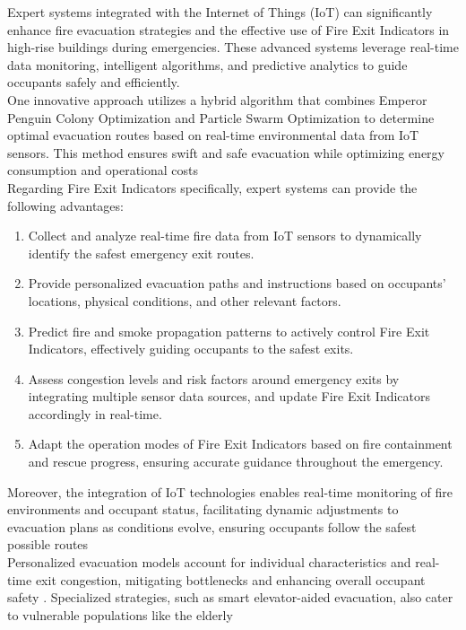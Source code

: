 \documentclass[12pt,a4paper]{article}
\begin{document}
\noindent Expert systems integrated with the Internet of Things (IoT) can significantly enhance fire evacuation strategies and the effective use of Fire Exit Indicators in high-rise buildings during emergencies. These advanced systems leverage real-time data monitoring, intelligent algorithms, and predictive analytics to guide occupants safely and efficiently.\\

\noindent One innovative approach utilizes a hybrid algorithm that combines Emperor Penguin Colony Optimization and Particle Swarm Optimization to determine optimal evacuation routes based on real-time environmental data from IoT sensors. This method ensures swift and safe evacuation while optimizing energy consumption and operational costs \citep{question_2.1}\\

\noindent Regarding Fire Exit Indicators specifically, expert systems can provide the following advantages:
\begin{enumerate}
    \item Collect and analyze real-time fire data from IoT sensors to dynamically identify the safest emergency exit routes.
   \item Provide personalized evacuation paths and instructions based on occupants' locations, physical conditions, and other relevant factors.
   \item Predict fire and smoke propagation patterns to actively control Fire Exit Indicators, effectively guiding occupants to the safest exits.
    \item Assess congestion levels and risk factors around emergency exits by integrating multiple sensor data sources, and update Fire Exit Indicators accordingly in real-time.
    \item Adapt the operation modes of Fire Exit Indicators based on fire containment and rescue progress, ensuring accurate guidance throughout the emergency.
\end{enumerate}

\noindent Moreover, the integration of IoT technologies enables real-time monitoring of fire environments and occupant status, facilitating dynamic adjustments to evacuation plans as conditions evolve, ensuring occupants follow the safest possible routes \citep{question_2.2}\\

\noindent Personalized evacuation models account for individual characteristics and real-time exit congestion, mitigating bottlenecks and enhancing overall occupant safety \citep{question_2.3}. Specialized strategies, such as smart elevator-aided evacuation, also cater to vulnerable populations like the elderly \citep{question_2.4}\\
\end{document}
